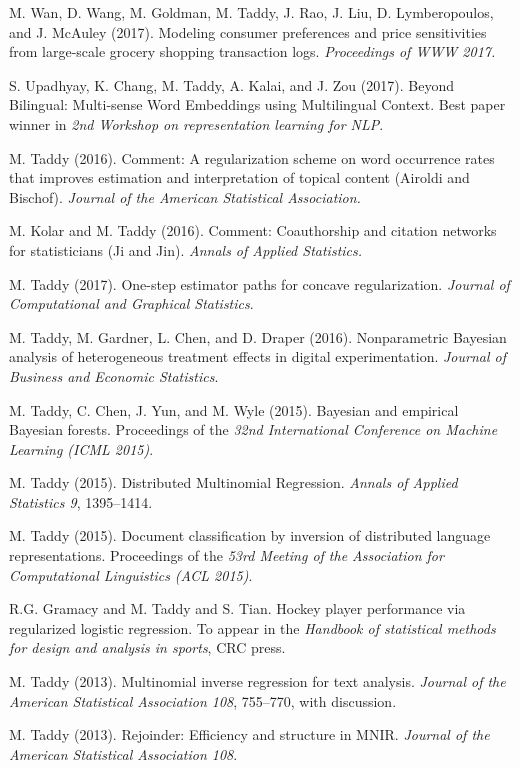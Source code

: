 \documentclass[margin,line]{res}
\begin{document}
\begin{resume}
M. Wan, D. Wang, M. Goldman, M. Taddy, J. Rao, J. Liu, D. Lymberopoulos, and J. McAuley (2017).  Modeling consumer preferences and price sensitivities from large-scale grocery shopping transaction logs. {\it Proceedings of WWW 2017.}

S. Upadhyay, K. Chang, M. Taddy, A. Kalai, and J. Zou (2017).  Beyond Bilingual: Multi-sense Word Embeddings using Multilingual
Context. Best paper winner in {\it 2nd Workshop on representation learning for NLP}.

M. Taddy (2016). Comment: A regularization scheme on word occurrence rates that improves estimation and interpretation of topical content (Airoldi and Bischof). {\it Journal of the American Statistical Association.} 

M. Kolar and M. Taddy (2016).  Comment: Coauthorship and citation networks for statisticians (Ji and Jin).  {\it Annals of Applied Statistics. }


M. Taddy (2017). One-step estimator paths for concave regularization.  {\em Journal of Computational and Graphical Statistics}.

M. Taddy, M. Gardner, L. Chen, and D. Draper (2016).  Nonparametric Bayesian analysis of heterogeneous treatment effects in digital experimentation.  {\em Journal of Business and Economic Statistics}.

M. Taddy, C. Chen, J. Yun, and M. Wyle (2015). Bayesian and empirical Bayesian forests.  Proceedings of the {\em 32nd International Conference on Machine Learning (ICML 2015)}.

M. Taddy (2015). Distributed Multinomial Regression.  {\em Annals of Applied Statistics 9}, 1395--1414.

M. Taddy (2015). Document classification by inversion of distributed language representations. Proceedings of the {\em 53rd Meeting of the Association for Computational Linguistics (ACL 2015)}.

R.G. Gramacy and M. Taddy and S. Tian.  Hockey player performance via regularized logistic regression.
To appear in the {\it Handbook of statistical methods for design and analysis in sports}, CRC press.


M. Taddy (2013).  Multinomial inverse regression for text analysis.  
{\it Journal of the American Statistical
  Association 108}, 755--770, with discussion.

M. Taddy (2013).   Rejoinder: Efficiency and structure in MNIR.  {\it Journal of the American Statistical
  Association 108}.





\end{resume}
\end{document}
